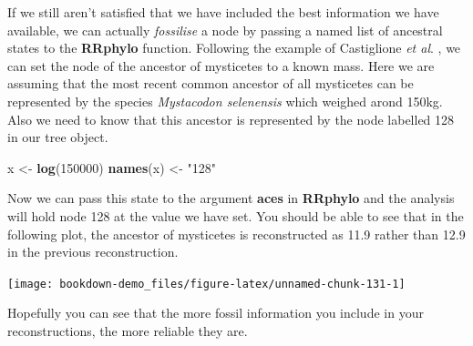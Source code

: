 \documentclass[
]{book}
\newenvironment{Shaded}{\begin{snugshade}}{\end{snugshade}}
\newcommand{\DataTypeTok}[1]{\textcolor[rgb]{0.13,0.29,0.53}{#1}}
\newcommand{\DecValTok}[1]{\textcolor[rgb]{0.00,0.00,0.81}{#1}}
\newcommand{\FloatTok}[1]{\textcolor[rgb]{0.00,0.00,0.81}{#1}}
\newcommand{\KeywordTok}[1]{\textcolor[rgb]{0.13,0.29,0.53}{\textbf{#1}}}
\newcommand{\NormalTok}[1]{#1}
\newcommand{\OperatorTok}[1]{\textcolor[rgb]{0.81,0.36,0.00}{\textbf{#1}}}
\newcommand{\OtherTok}[1]{\textcolor[rgb]{0.56,0.35,0.01}{#1}}
\newcommand{\StringTok}[1]{\textcolor[rgb]{0.31,0.60,0.02}{#1}}
\begin{document}
If we still aren't satisfied that we have included the best information we have available, we can actually \emph{fossilise} a node by passing a named list of ancestral states to the \textbf{RRphylo} function. Following the example of Castiglione \emph{et al}. \citeyearpar{Castiglione20}, we can set the node of the ancestor of mysticetes to a known mass. Here we are assuming that the most recent common ancestor of all mysticetes can be represented by the species \emph{Mystacodon selenensis} which weighed arond 150kg. Also we need to know that this ancestor is represented by the node labelled 128 in our tree object.

\begin{Shaded}
\begin{Highlighting}[]
\NormalTok{x \textless{}{-}}\StringTok{ }\KeywordTok{log}\NormalTok{(}\DecValTok{150000}\NormalTok{)}
\KeywordTok{names}\NormalTok{(x) \textless{}{-}}\StringTok{ "128"}
\end{Highlighting}
\end{Shaded}

Now we can pass this state to the argument \textbf{aces} in \textbf{RRphylo} and the analysis will hold node 128 at the value we have set. You should be able to see that in the following plot, the ancestor of mysticetes is reconstructed as 11.9 rather than 12.9 in the previous reconstruction.

\begin{Shaded}
\end{Shaded}

\begin{center}\texttt{[image: bookdown-demo\_files/figure-latex/unnamed-chunk-131-1]} \end{center}

Hopefully you can see that the more fossil information you include in your reconstructions, the more reliable they are.
\end{document}
